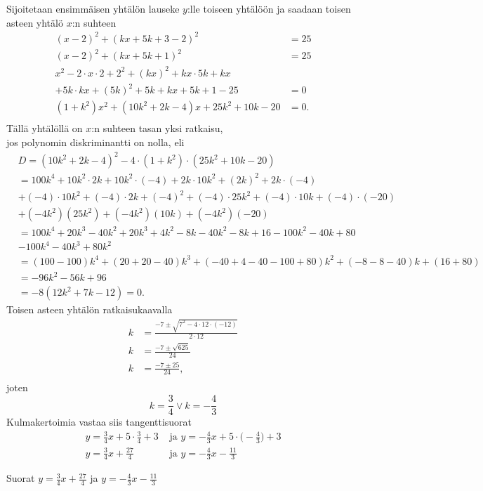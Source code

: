 \begin{esimerkki}
\begin{esimratk}
Sijoitetaan ensimmäisen yhtälön lauseke $y$:lle toiseen yhtälöön ja saadaan toisen asteen yhtälö $x$:n suhteen
\begin{align*}
(x-2)^2+(kx+5k+3-2)^2&=25 \\
(x-2)^2+(kx+5k+1)^2&=25 \\
x^2-2\cdot x\cdot 2 +2^2+(kx)^2+kx\cdot 5k+kx&\\
+5k\cdot kx+(5k)^2+5k+kx+5k+1-25& =0 \\
(1+k^2)x^2+(10k^2+2k-4)x+25k^2+10k-20& = 0. \\
\end{align*}
Tällä yhtälöllä on $x$:n suhteen tasan yksi ratkaisu, \\ jos polynomin diskriminantti on nolla, eli
\begin{align*}
& D = (10k^2+2k-4)^2-4\cdot(1+k^2)\cdot(25k^2+10k-20) \\ 
&= 100k^4+10k^2\cdot 2k+10k^2\cdot (-4) +2k\cdot 10k^2+(2k)^2+2k\cdot (-4) \\
& +(-4)\cdot 10k^2+(-4)\cdot 2k+(-4)^2+(-4)\cdot 25k^2+(-4)\cdot 10k+(-4)\cdot (-20) \\
& +(-4k^2)(25k^2)+(-4k^2)(10k)+(-4k^2)(-20) \\
& = 100k^4+20k^3-40k^2+20k^3+4k^2-8k-40k^2-8k+16-100k^2-40k+80 \\
& -100k^4-40k^3+80k^2 \\
& = (100-100)k^4+(20+20-40)k^3+(-40+4-40-100+80)k^2+(-8-8-40)k+(16+80) \\
& = -96k^2-56k+96 \\
&=-8(12k^2+7k-12) = 0.
\end{align*}
Toisen asteen yhtälön ratkaisukaavalla
\begin{align*}
k &= \frac{-7\pm \sqrt{7^2-4\cdot 12\cdot (-12)}}{2\cdot 12} \\
k &= \frac{-7\pm \sqrt{625}}{24} \\
k &= \frac{-7\pm 25 }{24}, \\
\end{align*}
joten
\[
k =  \frac{3}{4} \vee k = -\frac{4}{3}
\]
Kulmakertoimia vastaa siis tangenttisuorat
\begin{align*}
y = \frac{3}{4}x+5\cdot \frac{3}{4}+3 &\textrm{  ja  } y = -\frac{4}{3}x+5\cdot \Big(-\frac{4}{3}\Big)+3 \\
y = \frac{3}{4}x+\frac{27}{4} &\textrm{  ja  } y = -\frac{4}{3}x-\frac{11}{3}
\end{align*}

\begin{esimvast}
Suorat $y = \frac{3}{4}x+\frac{27}{4}$ ja $y = -\frac{4}{3}x-\frac{11}{3}$
\end{esimvast}
\end{esimratk}
\end{esimerkki}



